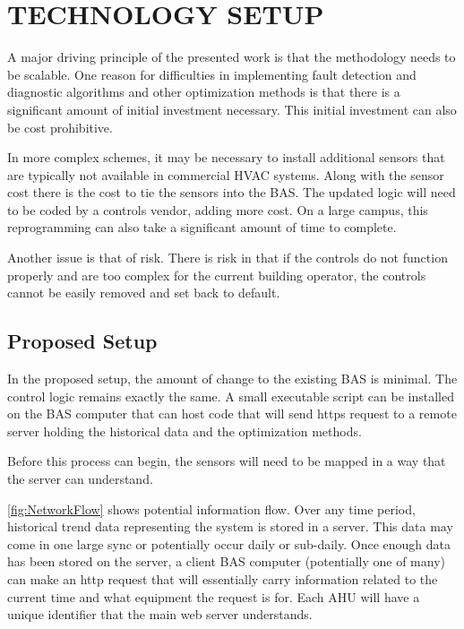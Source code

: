 \chapter{\uppercase{Technology Setup}}

A major driving principle of the presented work is that the methodology needs to be scalable. One reason for difficulties in implementing fault detection and diagnostic algorithms and other optimization methods is that there is a significant amount of initial investment necessary. This initial investment can also be cost prohibitive. 

In more complex schemes, it may be necessary to install additional sensors that are typically not available in commercial HVAC systems. Along with the sensor cost there is the cost to tie the sensors into the BAS. The updated logic will need to be coded by a controls vendor, adding more cost. On a large campus, this reprogramming can also take a significant amount of time to complete. 

Another issue is that of risk. There is risk in that if the controls do not function properly and are too complex for the current building operator, the controls cannot be easily removed and set back to default. 

\section{Proposed Setup}

In the proposed setup, the amount of change to the existing BAS is minimal. The control logic remains exactly the same. A small executable script can be installed on the BAS computer that can host code that will send https request to a remote server holding the historical data and the optimization methods. 

Before this process can begin, the sensors will need to be mapped in a way that the server can understand. 

\figref{} \ref{fig:NetworkFlow} shows potential information flow. Over any time period, historical trend data representing the system is stored in a server. This data may come in one large sync or potentially occur daily or sub-daily. Once enough data has been stored on the server, a client BAS computer (potentially one of many) can make an http request that will essentially carry information related to the current time and what equipment the request is for. Each AHU will have a unique identifier that the main web server understands. 

